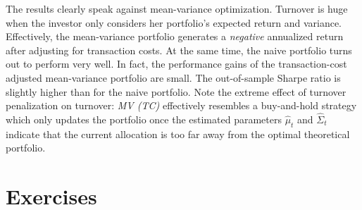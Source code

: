 \documentclass[
]{book}
\begin{document}
The results clearly speak against mean-variance optimization. Turnover is huge when the investor only considers her portfolio's expected return and variance. Effectively, the mean-variance portfolio generates a \emph{negative} annualized return after adjusting for transaction costs. At the same time, the naive portfolio turns out to perform very well. In fact, the performance gains of the transaction-cost adjusted mean-variance portfolio are small. The out-of-sample Sharpe ratio is slightly higher than for the naive portfolio. Note the extreme effect of turnover penalization on turnover: \emph{MV (TC)} effectively resembles a buy-and-hold strategy which only updates the portfolio once the estimated parameters \(\hat\mu_t\) and \(\hat\Sigma_t\)indicate that the current allocation is too far away from the optimal theoretical portfolio.

\hypertarget{exercises-11}{%
\section{Exercises}\label{exercises-11}}
\end{document}
